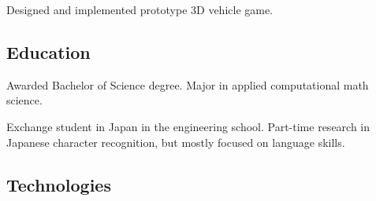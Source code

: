 \documentclass{article}
\begin{document}
Designed and implemented prototype 3D vehicle game.






\subsection{Education}

Awarded Bachelor of Science degree.  Major in applied computational math science.

Exchange student in Japan in the engineering school. Part-time
research in Japanese character recognition, but mostly focused on
language skills.

\newpage
\subsection{Technologies}
\end{document}
